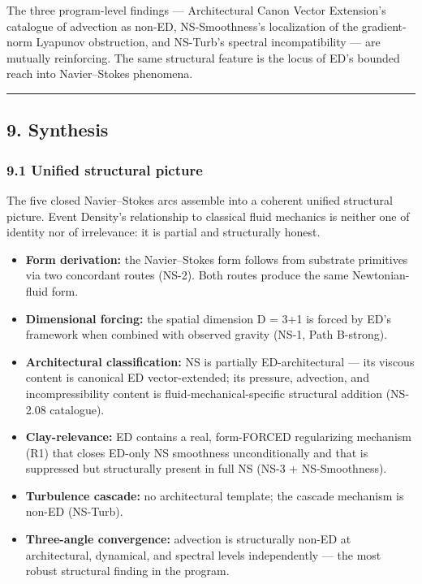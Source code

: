 \documentclass[
]{article}
\providecommand{\tightlist}{%
  \setlength{\itemsep}{0pt}\setlength{\parskip}{0pt}}
\begin{document}
The three program-level findings --- Architectural Canon Vector
Extension's catalogue of advection as non-ED, NS-Smoothness's
localization of the gradient-norm Lyapunov obstruction, and NS-Turb's
spectral incompatibility --- are mutually reinforcing. The same
structural feature is the locus of ED's bounded reach into
Navier--Stokes phenomena.

\begin{center}\rule{0.5\linewidth}{0.5pt}\end{center}

\subsection{9. Synthesis}\label{synthesis}

\subsubsection{9.1 Unified structural
picture}\label{unified-structural-picture}

The five closed Navier--Stokes arcs assemble into a coherent unified
structural picture. Event Density's relationship to classical fluid
mechanics is neither one of identity nor of irrelevance: it is partial
and structurally honest.

\begin{itemize}
\tightlist
\item
  \textbf{Form derivation:} the Navier--Stokes form follows from
  substrate primitives via two concordant routes (NS-2). Both routes
  produce the same Newtonian-fluid form.
\item
  \textbf{Dimensional forcing:} the spatial dimension D = 3+1 is forced
  by ED's framework when combined with observed gravity (NS-1, Path
  B-strong).
\item
  \textbf{Architectural classification:} NS is partially
  ED-architectural --- its viscous content is canonical ED
  vector-extended; its pressure, advection, and incompressibility
  content is fluid-mechanical-specific structural addition (NS-2.08
  catalogue).
\item
  \textbf{Clay-relevance:} ED contains a real, form-FORCED regularizing
  mechanism (R1) that closes ED-only NS smoothness unconditionally and
  that is suppressed but structurally present in full NS (NS-3 +
  NS-Smoothness).
\item
  \textbf{Turbulence cascade:} no architectural template; the cascade
  mechanism is non-ED (NS-Turb).
\item
  \textbf{Three-angle convergence:} advection is structurally non-ED at
  architectural, dynamical, and spectral levels independently --- the
  most robust structural finding in the program.
\end{itemize}
\end{document}
